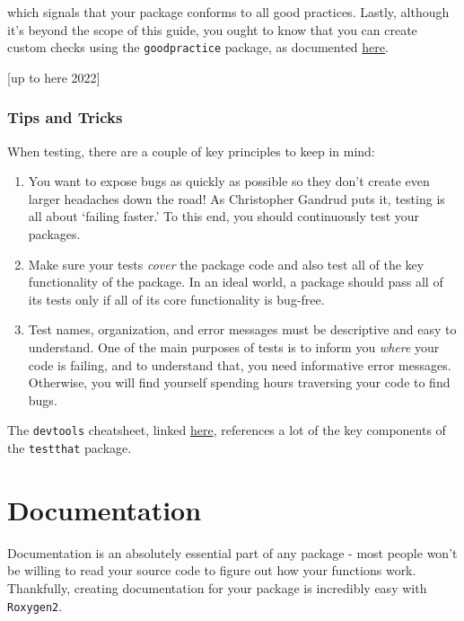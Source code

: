 \documentclass[
]{book}
\providecommand{\tightlist}{%
  \setlength{\itemsep}{0pt}\setlength{\parskip}{0pt}}
\begin{document}
which signals that your package conforms to all good practices. Lastly, although it's beyond the scope of this guide, you ought to know that you can create custom checks using the \texttt{goodpractice} package, as documented \href{https://github.com/MangoTheCat/goodpractice/blob/master/vignettes/custom_checks.Rmd}{here}.

{[}up to here 2022{]}

\hypertarget{tips-and-tricks}{%
\subsection{Tips and Tricks}\label{tips-and-tricks}}

When testing, there are a couple of key principles to keep in mind:

\begin{enumerate}
\def\labelenumi{\arabic{enumi}.}
\tightlist
\item
  You want to expose bugs as quickly as possible so they don't create even larger headaches down the road! As Christopher Gandrud puts it, testing is all about `failing faster.' To this end, you should continuously test your packages.
\item
  Make sure your tests \emph{cover} the package code and also test all of the key functionality of the package. In an ideal world, a package should pass all of its tests only if all of its core functionality is bug-free.
\item
  Test names, organization, and error messages must be descriptive and easy to understand. One of the main purposes of tests is to inform you \emph{where} your code is failing, and to understand that, you need informative error messages. Otherwise, you will find yourself spending hours traversing your code to find bugs.
\end{enumerate}

The \texttt{devtools} cheatsheet, linked \href{https://www.rstudio.com/wp-content/uploads/2015/03/devtools-cheatsheet.pdf}{here}, references a lot of the key components of the \texttt{testthat} package.

\hypertarget{documentation}{%
\chapter{Documentation}\label{documentation}}

Documentation is an absolutely essential part of any package - most people won't be willing to read your source code to figure out how your functions work. Thankfully, creating documentation for your package is incredibly easy with \texttt{Roxygen2}.
\end{document}
